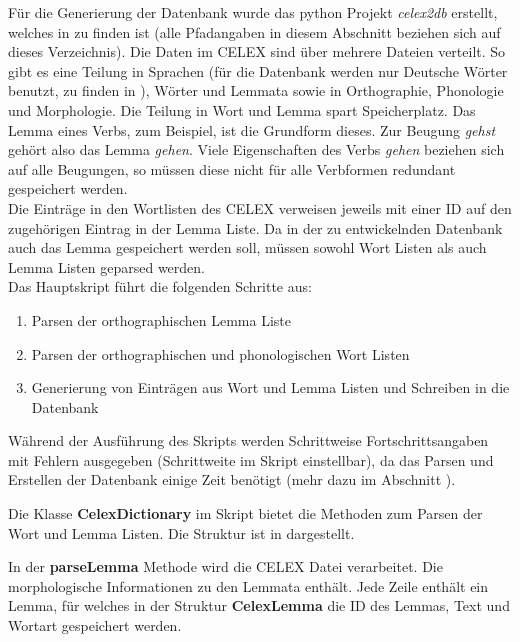 Für die Generierung der Datenbank wurde das python Projekt \textit{celex2db} erstellt, welches in  zu finden ist (alle Pfadangaben in diesem Abschnitt beziehen sich auf dieses Verzeichnis). Die Daten im CELEX sind über mehrere Dateien verteilt. So gibt es eine Teilung in Sprachen (für die Datenbank werden nur Deutsche Wörter benutzt, zu finden in ), Wörter und Lemmata sowie in Orthographie, Phonologie und Morphologie. Die Teilung in Wort und Lemma spart Speicherplatz. Das Lemma eines Verbs, zum Beispiel, ist die Grundform dieses. Zur Beugung \textit{gehst} gehört also das Lemma \textit{gehen}. Viele Eigenschaften des Verbs \textit{gehen} beziehen sich auf alle Beugungen, so müssen diese nicht für alle Verbformen redundant gespeichert werden.\\
Die Einträge in den Wortlisten des CELEX verweisen jeweils mit einer ID auf den zugehörigen Eintrag in der Lemma Liste. Da in der zu entwickelnden Datenbank auch das Lemma gespeichert werden soll, müssen sowohl Wort Listen als auch Lemma Listen geparsed werden.\\

Das Hauptskript  führt die folgenden Schritte aus:
\begin{enumerate}
	\item Parsen der orthographischen Lemma Liste
	\item Parsen der orthographischen und phonologischen Wort Listen
	\item Generierung von Einträgen aus Wort und Lemma Listen und Schreiben in die Datenbank
\end{enumerate}
Während der Ausführung des Skripts werden Schrittweise Fortschrittsangaben mit Fehlern ausgegeben (Schrittweite im Skript einstellbar), da das Parsen und Erstellen der Datenbank einige Zeit benötigt (mehr dazu im Abschnitt ).

Die Klasse \textbf{CelexDictionary} im Skript  bietet die Methoden zum Parsen der Wort und Lemma Listen. Die Struktur ist in  dargestellt.\\


In der \textbf{parseLemma} Methode wird die CELEX Datei  verarbeitet. Die morphologische Informationen zu den Lemmata enthält. Jede Zeile enthält ein Lemma, für welches in der Struktur \textbf{CelexLemma} die ID des Lemmas, Text und Wortart gespeichert werden.\\

